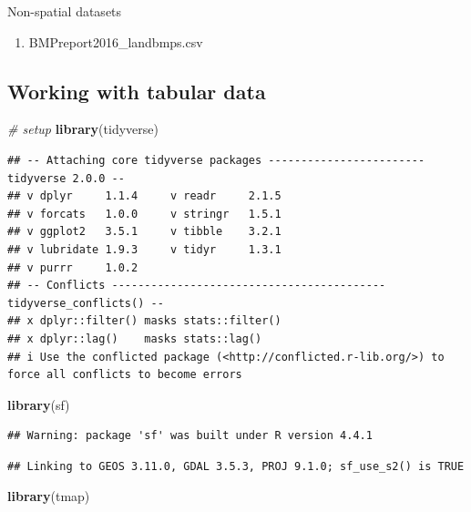 \documentclass[]{article}
\newenvironment{Shaded}{\begin{snugshade}}{\end{snugshade}}
\newcommand{\CommentTok}[1]{\textcolor[rgb]{0.56,0.35,0.01}{\textit{#1}}}
\newcommand{\FunctionTok}[1]{\textcolor[rgb]{0.13,0.29,0.53}{\textbf{#1}}}
\newcommand{\NormalTok}[1]{#1}
\providecommand{\tightlist}{%
  \setlength{\itemsep}{0pt}\setlength{\parskip}{0pt}}
\begin{document}
Non-spatial datasets

\begin{enumerate}
\def\labelenumi{\arabic{enumi}.}
\tightlist
\item
  BMPreport2016\_landbmps.csv
\end{enumerate}

\subsection{Working with tabular data}\label{working-with-tabular-data}

\begin{Shaded}
\begin{Highlighting}[]
\CommentTok{\# setup}
\FunctionTok{library}\NormalTok{(tidyverse)}
\end{Highlighting}
\end{Shaded}

\begin{verbatim}
## -- Attaching core tidyverse packages ------------------------ tidyverse 2.0.0 --
## v dplyr     1.1.4     v readr     2.1.5
## v forcats   1.0.0     v stringr   1.5.1
## v ggplot2   3.5.1     v tibble    3.2.1
## v lubridate 1.9.3     v tidyr     1.3.1
## v purrr     1.0.2     
## -- Conflicts ------------------------------------------ tidyverse_conflicts() --
## x dplyr::filter() masks stats::filter()
## x dplyr::lag()    masks stats::lag()
## i Use the conflicted package (<http://conflicted.r-lib.org/>) to force all conflicts to become errors
\end{verbatim}

\begin{Shaded}
\begin{Highlighting}[]
\FunctionTok{library}\NormalTok{(sf)}
\end{Highlighting}
\end{Shaded}

\begin{verbatim}
## Warning: package 'sf' was built under R version 4.4.1
\end{verbatim}

\begin{verbatim}
## Linking to GEOS 3.11.0, GDAL 3.5.3, PROJ 9.1.0; sf_use_s2() is TRUE
\end{verbatim}

\begin{Shaded}
\begin{Highlighting}[]
\FunctionTok{library}\NormalTok{(tmap)}
\end{Highlighting}
\end{Shaded}
\end{document}
